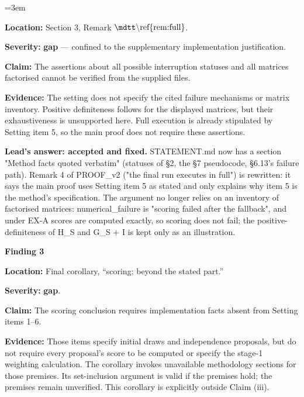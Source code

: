 \documentclass[11pt]{report}
\newcommand{\mdlbl}[1]{\textup{#1}}
\newenvironment{mdblock}{\begingroup\mdfont\raggedright\setlength{\parindent}{0pt}\setlength{\parskip}{0.55em}\emergencystretch=3em}{\par\endgroup}
\newenvironment{mdquote}{\begin{list}{}{\setlength{\leftmargin}{1.2em}\setlength{\rightmargin}{0pt}\setlength{\topsep}{2pt}\setlength{\parsep}{0.55em}\setlength{\itemsep}{0pt}}\item\relax}{\end{list}}
\newcommand{\mdhead}[2]{\par\vspace{0.7em}\noindent{\bfseries\ifcase#1\or\large\or\normalsize\or\normalsize\or\small\or\small\or\small\fi #2}\par\nopagebreak\vspace{0.1em}}
\begin{document}
\begin{mdblock}
\begin{mdquote}
\begin{mdnum}
\item[\mdlbl{1.}] \textbf{Location:} Section 3, Remark \(\text{\mdtt\textbackslash ref\{rem:full\}}\).
\item[\mdlbl{2.}] \textbf{Severity:} \textbf{gap} — confined to the supplementary implementation justification.
\item[\mdlbl{3.}] \textbf{Claim:} The assertions about all possible interruption statuses and all matrices factorised cannot be verified from the supplied files.
\item[\mdlbl{4.}] \textbf{Evidence:} The setting does not specify the cited failure mechanisms or matrix inventory. Positive definiteness follows for the displayed matrices, but their exhaustiveness is unsupported here. Full execution is already stipulated by Setting item 5, so the main proof does not require these assertions.
\end{mdnum}
\end{mdquote}

\textbf{Lead's answer: accepted and fixed.} STATEMENT.md now has a section "Method facts quoted verbatim" (statuses of §2, the §7 pseudocode, §6.13's failure path). Remark 4 of PROOF\_v2 ("the final run executes in full") is rewritten: it says the main proof uses Setting item 5 as stated and only explains why item 5 is the method's specification. The argument no longer relies on an inventory of factorised matrices: {\mdtt numerical\_\allowbreak{}failure} is "scoring failed after the fallback", and under EX-A scores are computed exactly, so scoring does not fail; the positive-definiteness of H\_S and G\_S + I is kept only as an illustration.

\mdhead{3}{A1-F3 (gap)}

\begin{mdquote}
\textbf{Finding 3}

\begin{mdnum}
\item[\mdlbl{1.}] \textbf{Location:} Final corollary, “scoring; beyond the stated part.”
\item[\mdlbl{2.}] \textbf{Severity:} \textbf{gap}.
\item[\mdlbl{3.}] \textbf{Claim:} The scoring conclusion requires implementation facts absent from Setting items 1–6.
\item[\mdlbl{4.}] \textbf{Evidence:} Those items specify initial draws and independence proposals, but do not require every proposal’s score to be computed or specify the stage-1 weighting calculation. The corollary invokes unavailable methodology sections for those premises. Its set-inclusion argument is valid if the premises hold; the premises remain unverified. This corollary is explicitly outside Claim (iii).
\end{mdnum}
\end{mdquote}


\end{mdblock}
\end{document}
